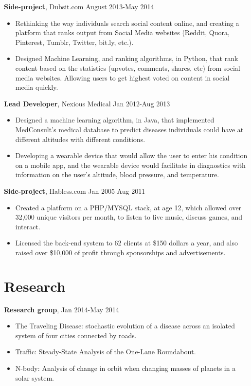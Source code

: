 \documentclass[margin]{res}
\begin{document}
\begin{resume}
{\bf Side-project}, Dubsit.com \hfill August 2013-May 2014
\begin{itemize} \itemsep -2pt 
\item Rethinking the way individuals search social content online, and creating a platform that ranks output from Social Media websites (Reddit, Quora, Pinterest, Tumblr, Twitter, bit.ly, etc.).
\item Designed Machine Learning, and ranking algorithms, in Python, that rank content based on the statistics (upvotes, comments, shares, etc) from social media websites. Allowing users to get highest voted on content in social media quickly.
\end{itemize}

 {\bf Lead Developer}, Nexious Medical \hfill Jan 2012-Aug 2013
 \begin{itemize} \itemsep -2pt
 \item Designed a machine learning algorithm, in Java, that implemented MedConsult's medical database to predict diseases individuals could have at different altitudes with different conditions.
 \item Developing a wearable device that would allow the user to enter his condition on a mobile app, and the wearable device would facilitate in diagnostics with information on the user's altitude, blood pressure, and temperature.
 \end{itemize}

{\bf Side-project}, Habless.com \hfill Jan 2005-Aug 2011
\begin{itemize} \itemsep -2pt 
\item Created a platform on a PHP/MYSQL stack, at age 12, which allowed over 32,000
unique visitors per month, to listen to live music, discuss games, and interact.
\item Licensed the back-end system to 62 clients at \$150 dollars a year, and also raised over \$10,000 of profit through sponsorships and advertisements.
\end{itemize}

\section{Research}

{\bf Research group}, \hfill Jan 2014-May 2014
\begin{itemize} \itemsep -2pt 
\item The Traveling Disease: stochastic evolution of a disease across an isolated system of four cities connected by roads.
\item Traffic: Steady-State Analysis of the One-Lane Roundabout.
\item N-body: Analysis of change in orbit when changing masses of planets in a solar system.
\end{itemize}


\end{resume}
\end{document}
